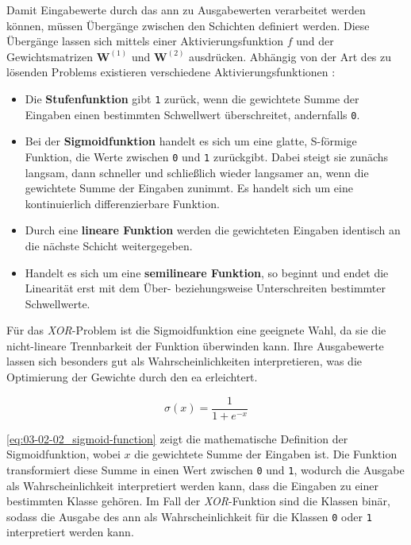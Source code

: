 Damit Eingabewerte durch das \Gls{ann} zu Ausgabewerten verarbeitet werden können, müssen Übergänge zwischen den Schichten definiert werden. Diese Übergänge lassen sich mittels einer Aktivierungsfunktion $f$ und der Gewichtsmatrizen $\mathbf{W}^{(1)}$ und $\mathbf{W}^{(2)}$ ausdrücken. Abhängig von der Art des zu lösenden Problems existieren verschiedene Aktivierungsfunktionen \cite[S. 14]{001_KII00_accompanying-booklet-for-KIIBU}:

\begin{itemize}
    \item Die \textbf{Stufenfunktion} gibt \texttt{1} zurück, wenn die gewichtete Summe der Eingaben einen bestimmten Schwellwert überschreitet, andernfalls \texttt{0}.
    \item Bei der \textbf{Sigmoidfunktion} handelt es sich um eine glatte, S-förmige Funktion, die Werte zwischen \texttt{0} und \texttt{1} zurückgibt. Dabei steigt sie zunächs langsam, dann schneller und schließlich wieder langsamer an, wenn die gewichtete Summe der Eingaben zunimmt. Es handelt sich um eine kontinuierlich differenzierbare Funktion.
    \item Durch eine \textbf{lineare Funktion} werden die gewichteten Eingaben identisch an die nächste Schicht weitergegeben.
    \item Handelt es sich um eine \textbf{semilineare Funktion}, so beginnt und endet die Linearität erst mit dem Über- beziehungsweise Unterschreiten bestimmter Schwellwerte.
\end{itemize}

Für das \textit{XOR}-Problem ist die Sigmoidfunktion eine geeignete Wahl, da sie die nicht-lineare Trennbarkeit der Funktion überwinden kann. Ihre Ausgabewerte lassen sich besonders gut als Wahrscheinlichkeiten interpretieren, was die Optimierung der Gewichte durch den \Gls{ea} erleichtert.

\begin{equation}
    \sigma(x) = \frac{1}{1 + e^{-x}}
    \label{eq:03-02-02_sigmoid-function}
\end{equation}

\autoref{eq:03-02-02_sigmoid-function} zeigt die mathematische Definition der Sigmoidfunktion, wobei $x$ die gewichtete Summe der Eingaben ist. Die Funktion transformiert diese Summe in einen Wert zwischen \texttt{0} und \texttt{1}, wodurch die Ausgabe als Wahrscheinlichkeit interpretiert werden kann, dass die Eingaben zu einer bestimmten Klasse gehören. Im Fall der \textit{XOR}-Funktion sind die Klassen binär, sodass die Ausgabe des \Gls{ann} als Wahrscheinlichkeit für die Klassen \texttt{0} oder \texttt{1} interpretiert werden kann.

